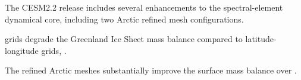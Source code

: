 \documentclass[draft]{agujournal2019}
\begin{document}





\begin{keypoints}
\item The CESM2.2 release includes several enhancements to the spectral-element dynamical core, including two Arctic refined mesh configurations.
\item {\color{blue}{Quasi-uniform unstructured}} grids degrade the Greenland Ice Sheet mass balance compared to latitude-longitude grids, {}.
\item The refined Arctic meshes substantially improve the surface mass balance over {\color{blue}{conventional grid resolutions}}.
\end{keypoints}

%
%

%
%
\end{document}
